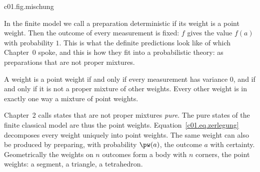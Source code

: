\begin{tpcfigure}{c01.fig.mischung}
  \caption{The construction of equation~\eqref{c01.eq.echte-mischung} for the loaded
    die $\pw$ of equation~\eqref{c01.eq.gezinkt}, with $a = 6$, $b = 1$ and
    $\varepsilon = \tfrac{1}{12}$. Starting from $\pw$ (left), the weight $\tfrac{1}{12}$ is
    moved once from $1$ to $6$ (middle, $q$) and once from $6$ to $1$ (right, $r$); the
    changed bars are hatched. Here $r$ is the fair die. The loaded die is the mixture
    $\pw = \tfrac12 q + \tfrac12 r$ and therefore not a point weight.}
\end{tpcfigure}

In the finite model we call a preparation deterministic if its weight is a point weight.
Then the outcome of every measurement is fixed: $f$ gives the value $f(a)$ with probability
$1$. This is what the definite predictions look like of which Chapter~0 spoke, and this
is how they fit into a probabilistic theory: as preparations that are not proper mixtures.

\begin{merksatz}
  A weight is a point weight if and only if every measurement has variance $0$, and if and
  only if it is not a proper mixture of other weights. Every other weight is in exactly
  one way a mixture of point weights.
\end{merksatz}

Chapter~2 calls states that are not proper mixtures \emph{pure}. The pure states of the
finite classical model are thus the point weights.
Equation~\eqref{c01.eq.zerlegung} decomposes every weight uniquely into point weights.
The same weight can also be produced by preparing, with probability $\pw(a)$, the outcome
$a$ with certainty.
Geometrically the weights on $n$ outcomes form a body with $n$ corners, the point weights:
a segment, a triangle, a tetrahedron.

